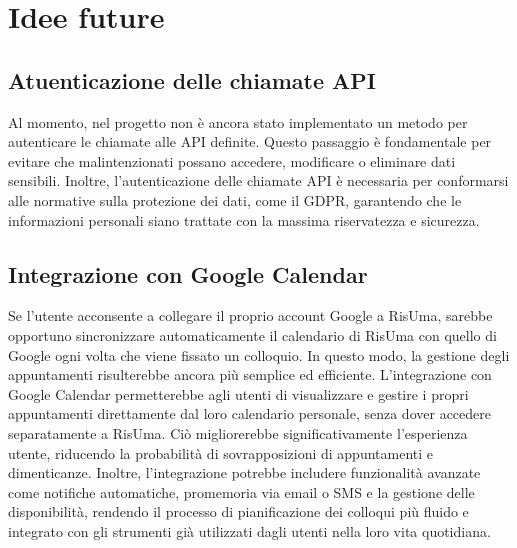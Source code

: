 \chapter{Idee future}
\section{Atuenticazione delle chiamate API}
Al momento, nel progetto non è ancora stato implementato un metodo per autenticare le chiamate alle API definite. 
Questo passaggio è fondamentale per evitare che malintenzionati possano accedere, modificare 
o eliminare dati sensibili. Inoltre, l'autenticazione delle chiamate API è necessaria per conformarsi alle normative sulla 
protezione dei dati, come il GDPR, garantendo che le informazioni personali siano trattate con la massima riservatezza e sicurezza.
\section{Integrazione con Google Calendar}
Se l'utente acconsente a collegare il proprio account Google a RisUma, sarebbe opportuno sincronizzare automaticamente il calendario 
di RisUma con quello di Google ogni volta che viene fissato un colloquio. In questo modo, la gestione degli appuntamenti risulterebbe 
ancora più semplice ed efficiente. L'integrazione con Google Calendar permetterebbe agli utenti di visualizzare e gestire i propri 
appuntamenti direttamente dal loro calendario personale, senza dover accedere separatamente a RisUma. 
Ciò migliorerebbe significativamente l'esperienza utente, riducendo la probabilità di sovrapposizioni di 
appuntamenti e dimenticanze. Inoltre, l'integrazione potrebbe includere funzionalità avanzate come notifiche automatiche, 
promemoria via email o SMS e la gestione delle disponibilità, rendendo il processo di pianificazione dei colloqui più fluido 
e integrato con gli strumenti già utilizzati dagli utenti nella loro vita quotidiana.
\clearpage
